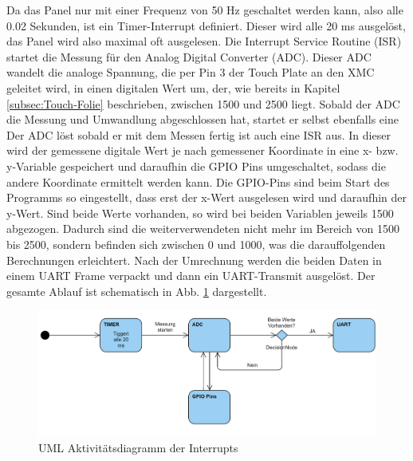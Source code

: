 \documentclass[12pt,a4paper,bibliography=totoc,listof=totoc]{scrartcl}
\begin{document}
Da das Panel nur mit einer Frequenz von 50 Hz geschaltet werden kann, also alle 0.02 Sekunden, ist ein Timer-Interrupt definiert. Dieser wird alle 20 ms ausgelöst, das Panel wird also maximal oft ausgelesen. Die Interrupt Service Routine (ISR) startet die Messung für den Analog Digital Converter (ADC). Dieser ADC wandelt die analoge Spannung, die per Pin 3 der Touch Plate an den XMC geleitet wird, in einen digitalen Wert um, der, wie bereits in Kapitel \ref{subsec:Touch-Folie} beschrieben, zwischen 1500 und 2500 liegt. Sobald der ADC die Messung und Umwandlung abgeschlossen hat, startet er selbst ebenfalls eine 
Der ADC löst sobald er mit dem Messen fertig ist auch eine ISR aus. In dieser wird der gemessene digitale Wert je nach gemessener Koordinate in eine x- bzw. y-Variable gespeichert und daraufhin die GPIO Pins umgeschaltet, sodass die andere Koordinate ermittelt werden kann.
Die GPIO-Pins sind beim Start des Programms so eingestellt, dass erst der x-Wert ausgelesen wird und daraufhin der y-Wert. Sind beide Werte vorhanden, so wird bei beiden Variablen jeweils 1500 abgezogen. Dadurch sind die weiterverwendeten nicht mehr im Bereich von 1500 bis 2500, sondern befinden sich zwischen 0 und 1000, was die darauffolgenden Berechnungen erleichtert. Nach der Umrechnung werden die beiden Daten in einem UART Frame verpackt und dann ein UART-Transmit ausgelöst.
Der gesamte Ablauf ist schematisch in Abb. \ref{fig:TouchUML} dargestellt.

\begin{figure}[htbp]
	\centering
	\includegraphics[scale = 0.6]{pics/TouchUML.png}
	\caption{UML Aktivitätsdiagramm der Interrupts}
	\label{fig:TouchUML}
\end{figure}
\end{document}
